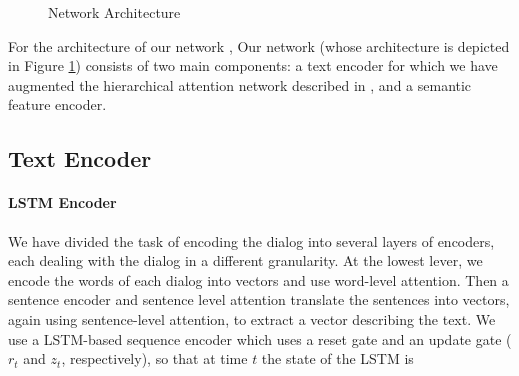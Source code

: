 \begin{figure}
\begin{center}
\caption{Network Architecture}\label{fig:arch}
\end{center}
\end{figure}
For the architecture of our network , 
Our network (whose architecture is depicted in Figure \ref{fig:arch}) consists of two main components: 
a text encoder for which we have augmented the hierarchical attention network described in \cite{attention}, 
and a semantic feature encoder. 

\subsection{Text Encoder}

\paragraph*{LSTM Encoder}
We have divided the task of encoding the dialog into several 
layers of encoders, each dealing with the dialog in a different granularity. 
At the lowest lever, we encode the words of each dialog into vectors 
and use word-level attention. Then a sentence encoder and sentence level attention 
translate the sentences into vectors, again using sentence-level attention, to extract a vector describing the text. 
We use a LSTM-based sequence encoder \cite{BahdanauCB14} which uses 
a reset gate and an update gate ($r_t$ and $z_t$, respectively), 
so that at time $t$ the state of the LSTM is 

